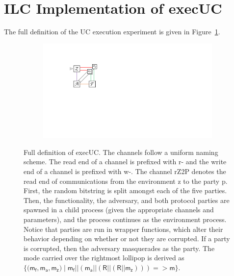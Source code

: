 \appendix




\onecolumn
\section{ILC Implementation of \textsf{execUC} }
\label{sec:full-execUC}
The full definition of the UC execution experiment is given in Figure~\ref{fig:execUC}.

\begin{figure}[h]
\begin{subfigure}{.75\textwidth}

\end{subfigure}
\begin{subfigure}{0.24\textwidth}
\includegraphics[width=\linewidth]{graphics/execUC-colored}
\end{subfigure}
\caption{Full definition of \textsf{execUC}. The channels follow a uniform
naming scheme. The read end of a channel is prefixed with \textsf{r-} and the
write end of a channel is prefixed with \textsf{w-}. The channel \textsf{rZ2P}
denotes the read end of communications from the environment \textsf{z} to the
party \textsf{p}. First, the random bitstring is split amongst each of the five
parties. Then, the functionality, the adversary, and both protocol parties are
spawned in a child process (given the appropriate channels and parameters), and
the process continues as the environment process. Notice that parties are run in
wrapper functions, which alter their behavior depending on whether or not they
are corrupted. If a party is corrupted, then the adversary masquerades as the
party. The mode carried over the rightmost lollipop is derived as $\{(\mathsf{m}_{\mathsf{f}},\mathsf{m}_{\mathsf{a}},\mathsf{m_{\mathsf{z}}) \mid \mathsf{m}_{\mathsf{f}}
|| (\mathsf{m}_{\mathsf{a}} || (\mathsf{R} || (\mathsf{R}
|| \mathsf{m}_{\mathsf{z}}))) => \mathsf{m}}\}$.}
\label{fig:execUC}
\end{figure}
\newpage
\twocolumn

